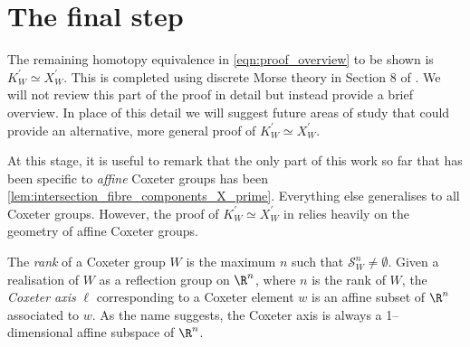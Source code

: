 \documentclass[class=article, crop=false]{standalone}
\begin{document}
\section{The final step}
The remaining homotopy equivalence in \eqref{eqn:proof_overview} to be shown is $K^\prime_W \simeq X^\prime_W$. This is completed using discrete Morse theory in Section 8 of \cite{paolini_salvetti_kpi1_2021}. We will not review this part of the proof in detail but instead provide a brief overview. In place of this detail we will suggest future areas of study that could provide an alternative, more general proof of $K^\prime_W \simeq X^\prime_W$.

At this stage, it is useful to remark that the only part of this work so far that has been specific to \emph{affine} Coxeter groups has been \cref{lem:intersection_fibre_components_X_prime}. Everything else generalises to all Coxeter groups. However, the proof of $K_W^\prime \simeq X^\prime_W$ in \cite{paolini_salvetti_kpi1_2021} relies heavily on the geometry of affine Coxeter groups.

The \emph{rank} of a Coxeter group $W$ is the maximum $n$ such that $\mathcal{S}^n_W \neq \emptyset$. Given a realisation of $W$ as a reflection group on $\R^n$, where $n$ is the rank of $W$, the \emph{Coxeter axis} $\ell$ corresponding to a Coxeter element $w$ is an affine subset of $\R^n$ associated to $w$. As the name suggests, the Coxeter axis is always a 1--dimensional affine subspace of $\R^n$.   
\end{document}
